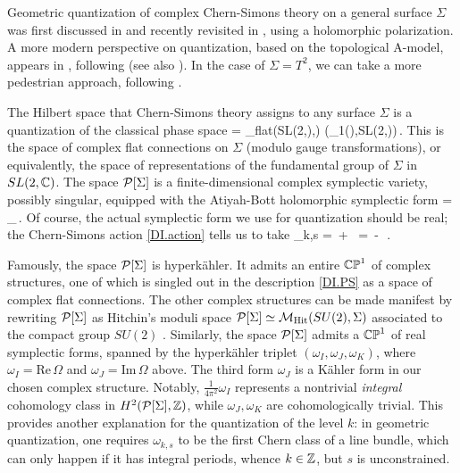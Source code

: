 \documentclass[12pt]{article}
\begin{document}
Geometric quantization of complex Chern-Simons theory on a general surface $\Sigma$ was first discussed in \cite{DIWitten-cx} and recently revisited in \cite{DIAG-HW}, using a holomorphic polarization. A more modern perspective on quantization, based on the topological A-model, appears in \cite{DIDGLZ}, following \cite{DIGW-branes} (see also \cite{DImirrorbranes}). In the case of $\Sigma=T^2$, we can take a more pedestrian approach, following \cite{DID-levelk, DIAK-complexCS}.

The Hilbert space that Chern-Simons theory assigns to any surface $\Sigma$ is a quantization of the classical phase space
%
\DIbe \CalP[\Sigma] = \CalM_{\rm flat}(SL(2,\BC),\Sigma) (\pi_1(\Sigma),SL(2,\BC))\,. \label{DI.PS} \DIee
%
This is the space of complex flat connections on $\Sigma$ (modulo gauge transformations), or equivalently, the space of representations of the fundamental group of $\Sigma$ in $SL(2,{\mathbb C})$. The space $\mathcal{P}[\Sigma]$ is a finite-dimensional complex symplectic variety, possibly singular, equipped with the Atiyah-Bott holomorphic symplectic form
%
\DIbe \Omega = \int_\Sigma \delta \CalA \wedge \delta \CalA\,. \label{DI.AB} \DIee
%
Of course, the actual symplectic form we use for quantization should be real; the Chern-Simons action \eqref{DI.action} tells us to take
%
\DIbe \omega_{k,s} = \,\Omega + \, \ol\Omega = \,\Omega - \,\Omega\,. \DIee


Famously, the space $\mathcal{P}[\Sigma]$ is hyperk\"ahler. It admits an entire ${\mathbb{CP}}^1$ of complex structures, one of which is singled out in the description \eqref{DI.PS} as a space of complex flat connections. The other complex structures can be made manifest by rewriting $\mathcal{P}[\Sigma]$ as Hitchin's moduli space $\mathcal{P}[\Sigma]\simeq \mathcal{M}_{\rm Hit}(SU(2),\Sigma)$ associated to the compact group $SU(2)$ \cite{DIHitchin-SD}. Similarly, the space $\mathcal{P}[\Sigma]$ admits a ${\mathbb{CP}}^1$ of real symplectic forms, spanned by the hyperk\"ahler triplet $(\omega_I,\omega_J,\omega_K)$, where $\omega_I=\text{Re}\,\Omega$ and $\omega_J = \text{Im}\,\Omega$ above. The third form $\omega_J$ is a K\"ahler form in our chosen complex structure. Notably, $\frac{1}{4\pi^2}\omega_I$ represents a nontrivial \emph{integral} cohomology class in $H^2(\mathcal{P}[\Sigma],{\mathbb Z})$, while $\omega_J,\omega_K$ are cohomologically trivial. This provides another explanation for the quantization of the level $k$: in geometric quantization, one requires $\omega_{k,s}$ to be the first Chern class of a line bundle, which can only happen if it has integral periods, whence $k\in {\mathbb Z}$, but $s$ is unconstrained.
\end{document}
